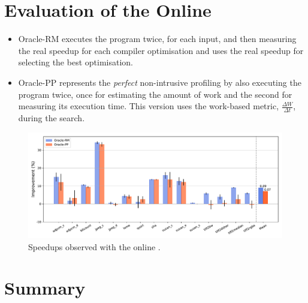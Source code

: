 \section{Evaluation of the Online {\IterComp}}

\begin{itemize}
\item Oracle-RM executes the program twice, for each input, and then measuring the real speedup for each compiler optimisation and uses the real speedup for selecting the best optimisation.
\item Oracle-PP represents the \textit{perfect} non-intrusive profiling by also executing the program twice, once for estimating the amount of work and the second for measuring its execution time.
This version uses the work-based metric, $\frac{\Delta W}{\Delta t}$, during the {\itercomp} search.
\end{itemize}

\begin{figure}[htb]
    \centering
    \includegraphics[width=\textwidth]{figs/speedups.pdf}
    \caption{Speedups observed with the online {\itercomp}.}
    \label{fig:speedups}
\end{figure}


%
%

\section{Summary}

